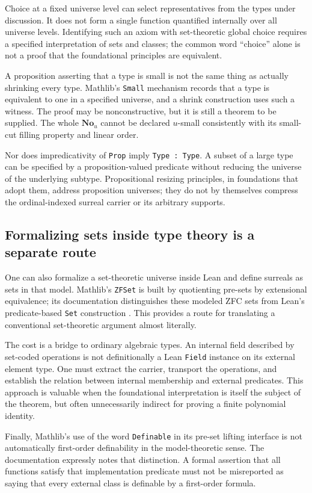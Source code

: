 \documentclass[11pt,letterpaper]{article}
\numberwithin{equation}{section}
\theoremstyle{definition}
\theoremstyle{remark}
\newcommand{\No}{\mathbf{No}}
\begin{document}
Choice at a fixed universe level can select representatives from the types under discussion. It does not form a single function quantified internally over all universe levels. Identifying such an axiom with set-theoretic global choice requires a specified interpretation of sets and classes; the common word ``choice'' alone is not a proof that the foundational principles are equivalent.

A proposition asserting that a type is small is not the same thing as actually shrinking every type. Mathlib's \texttt{Small} mechanism records that a type is equivalent to one in a specified universe, and a shrink construction uses such a witness. The proof may be nonconstructive, but it is still a theorem to be supplied. The whole $\No_u$ cannot be declared $u$-small consistently with its small-cut filling property and linear order.

Nor does impredicativity of \texttt{Prop} imply \texttt{Type : Type}. A subset of a large type can be specified by a proposition-valued predicate without reducing the universe of the underlying subtype. Propositional resizing principles, in foundations that adopt them, address proposition universes; they do not by themselves compress the ordinal-indexed surreal carrier or its arbitrary supports.

\subsection{Formalizing sets inside type theory is a separate route}
One can also formalize a set-theoretic universe inside Lean and define surreals as sets in that model. Mathlib's \texttt{ZFSet} is built by quotienting pre-sets by extensional equivalence; its documentation distinguishes these modeled ZFC sets from Lean's predicate-based \texttt{Set} construction \cite{LeanZFC}. This provides a route for translating a conventional set-theoretic argument almost literally.

The cost is a bridge to ordinary algebraic types. An internal field described by set-coded operations is not definitionally a Lean \texttt{Field} instance on its external element type. One must extract the carrier, transport the operations, and establish the relation between internal membership and external predicates. This approach is valuable when the foundational interpretation is itself the subject of the theorem, but often unnecessarily indirect for proving a finite polynomial identity.

Finally, Mathlib's use of the word \texttt{Definable} in its pre-set lifting interface is not automatically first-order definability in the model-theoretic sense. The documentation expressly notes that distinction. A formal assertion that all functions satisfy that implementation predicate must not be misreported as saying that every external class is definable by a first-order formula.
\end{document}

